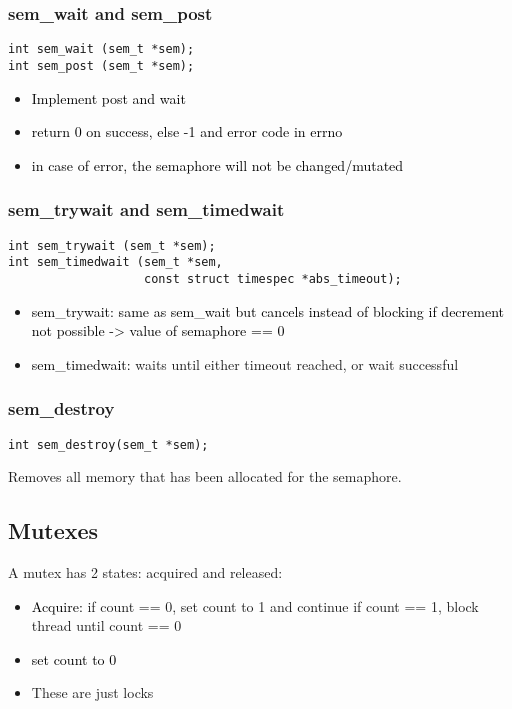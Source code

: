 \documentclass[main.tex,fontsize=8pt,paper=a4,paper=portrait,DIV=calc,]{scrartcl}
\begin{document}
\subsubsection{sem\_wait and sem\_post}
\begin{lstlisting}
int sem_wait (sem_t *sem);
int sem_post (sem_t *sem);
\end{lstlisting}
\begin{itemize}
\item \textcolor{black}{Implement post and wait}
\item \textcolor{black}{return 0 on success, else -1 and error code in errno}
\item \textcolor{black}{in case of error, the semaphore will not be changed/mutated}
\end{itemize} 

\subsubsection{sem\_trywait and sem\_timedwait}
\begin{lstlisting}
int sem_trywait (sem_t *sem);
int sem_timedwait (sem_t *sem,
                   const struct timespec *abs_timeout);
\end{lstlisting}
\begin{itemize}
\item \textcolor{black}{sem\_trywait: same as sem\_wait but cancels instead of blocking if decrement not possible -> value of semaphore == 0}
\item \textcolor{black}{sem\_timedwait:} waits until either timeout reached, or wait successful
\end{itemize} 

\subsubsection{sem\_destroy}
\begin{lstlisting}
int sem_destroy(sem_t *sem);
\end{lstlisting}
Removes all memory that has been allocated for the semaphore.

\subsection{Mutexes}
A mutex has 2 states: acquired and released:
\begin{itemize}
\item \textcolor{black}{Acquire:} \newline
  if count == 0, set count to 1 and continue\newline
  if count == 1, block thread until count == 0
\item \textcolor{black}{set count to 0}
\item These are just locks
\end{itemize} 
\end{document}
